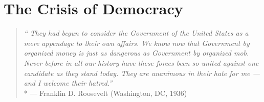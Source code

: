 

\section{The Crisis of Democracy}

\begin{quote}
	\emph{``%
	They had begun to consider the Government of the United States as a mere appendage to their own affairs. We know now that Government by organized money is just as dangerous as Government by organized mob. Never before in all our history have these forces been so united against one candidate as they stand today. They are unanimous in their hate for me --- and I welcome their hatred.''}\\*
	--- Franklin D. Roosevelt (Washington, DC, 1936)
\end{quote}



	
